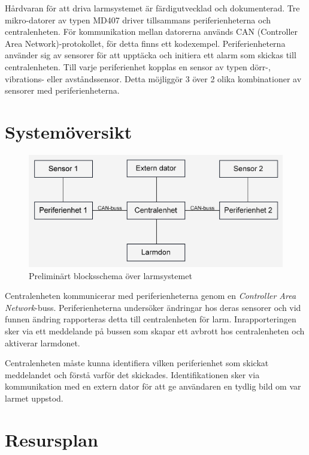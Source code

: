 \documentclass[a4paper]{article}
\begin{document}
Hårdvaran för att driva larmsystemet är färdigutvecklad och dokumenterad. Tre mikro-datorer av typen MD407 driver tillsammans periferienheterna och centralenheten. För kommunikation mellan datorerna används CAN (Controller Area Network)-protokollet, för detta finns ett kodexempel. Periferienheterna använder sig av sensorer för att upptäcka och initiera ett alarm som skickas till centralenheten. Till varje periferienhet kopplas en sensor av typen dörr-, vibrations- eller avståndssensor. Detta möjliggör 3 över 2 olika kombinationer av sensorer med periferienheterna.


\section{Systemöversikt}

\begin{figure}[H]
    \centering
    \includegraphics[width=\textwidth]{blockschema.png}
    \caption{Preliminärt blocksschema över larmsystemet}
\end{figure}

Centralenheten kommunicerar med periferienheterna genom en \textit{Controller Area Network}-buss. Periferienheterna undersöker ändringar hos deras sensorer och vid funnen ändring rapporteras detta till centralenheten för larm. Inrapporteringen sker via ett meddelande på bussen som skapar ett avbrott hos centralenheten och aktiverar larmdonet.

Centralenheten måste kunna identifiera vilken periferienhet som skickat meddelandet och förstå varför det skickades. Identifikationen sker via kommunikation med en extern dator för att ge användaren en tydlig bild om var larmet uppstod.

\section{Resursplan}
\end{document}
